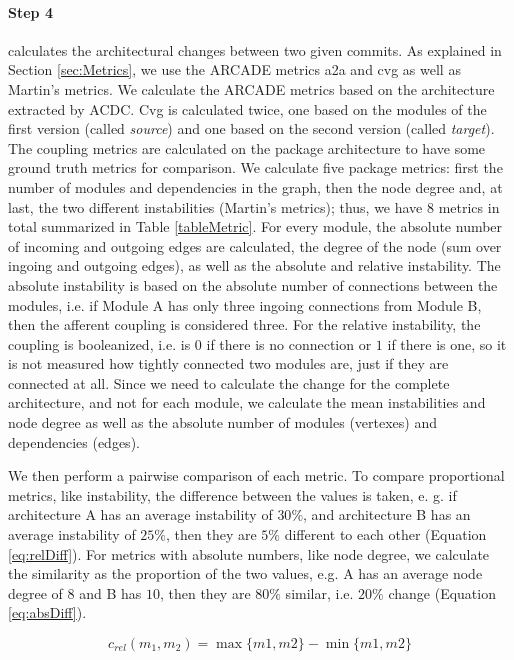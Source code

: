 \documentclass[sigconf, anonymous, review]{acmart}
\begin{document}
\paragraph{Step 4} calculates the architectural changes between two given commits.
As explained in Section \ref{sec:Metrics}, we use the ARCADE metrics a2a and cvg as well as Martin's metrics. We calculate the ARCADE metrics based on the architecture extracted by ACDC. Cvg is calculated twice, one based on the modules of the first version (called \textit{source}) and one based on the second version (called \textit{target}).
The coupling metrics are calculated on the package architecture to have some ground truth metrics for comparison. We calculate five package metrics: first the number of modules and dependencies in the graph, then the node degree and, at last, the two different instabilities (Martin's metrics); thus, we have 8 metrics in total summarized in Table \ref{tableMetric}.
For every module, the absolute number of incoming and outgoing edges are calculated, the degree of the node (sum over ingoing and outgoing edges), as well as the absolute and relative instability. The absolute instability is based on the absolute number of connections between the modules, i.e. if Module A has only three ingoing connections from Module B, then the afferent coupling is considered three. For the relative instability, the coupling is booleanized, i.e. is $0$ if there is no connection or $1$ if there is one, so it is not measured how tightly connected two modules are, just if they are connected at all.
Since we need to calculate the change for the complete architecture, and not for each module, we calculate the mean instabilities and node degree as well as the absolute number of modules (vertexes) and dependencies (edges).

We then perform a pairwise comparison of each metric. To compare proportional metrics, like instability, the difference between the values is taken, e. g. if architecture A has an average instability of $30\%$, and architecture B has an average instability of $25\%$, then they are $5\%$ different to each other (Equation \ref{eq:relDiff}). For metrics with absolute numbers, like node degree, we calculate the similarity as the proportion of the two values, e.g. A has an average node degree of $8$ and B has $10$, then they are $80\%$ similar, i.e. $20\%$ change (Equation \ref{eq:absDiff}).

\begin{equation} \label{eq:relDiff}
c_{rel}(m_1, m_2) =  \max\{m1, m2\} - \min\{m1, m2\}
\end{equation} 
\end{document}
